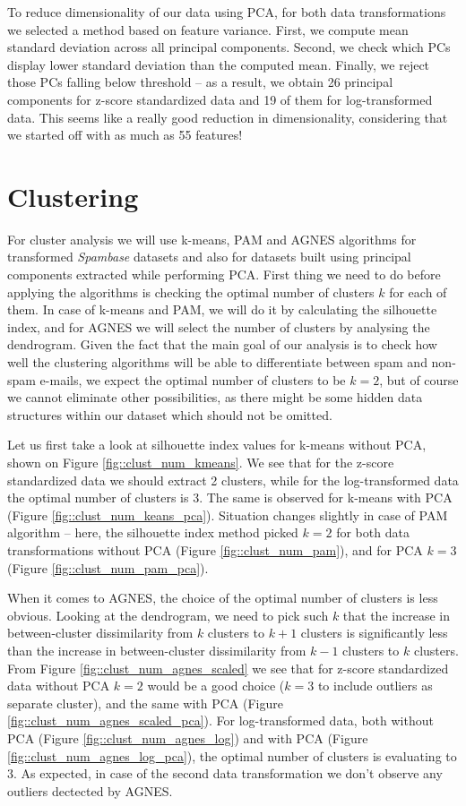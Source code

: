 \documentclass{article}
\begin{document}
	To reduce dimensionality of our data using PCA, for both data transformations we selected a method based on feature variance. First, we compute
	mean standard deviation across all principal components. Second, we check which PCs display lower standard deviation than the computed mean. Finally,
	we reject those PCs falling below threshold -- as a result, we obtain 26 principal components for z-score standardized data and 19 of them for log-transformed data.
	This seems like a really good reduction in dimensionality, considering that we started off with as much as 55 features! 
	
	\section{Clustering}
	For cluster analysis we will use k-means, PAM and AGNES algorithms for transformed \textit{Spambase} datasets and also for datasets built using principal components extracted while performing PCA. 
	First thing we need to do before applying the algorithms is checking the optimal number of clusters $k$ for each of them.
	In case of k-means and PAM, we will do it by calculating the silhouette index, and for AGNES we will select the number of clusters by analysing the dendrogram.
	Given the fact that the main goal of our analysis is to check how well the clustering algorithms will be able to differentiate between spam and non-spam e-mails,
	we expect the optimal number of clusters to be $k=2$, but of course we cannot eliminate other possibilities, as there might be some hidden data structures within our 
	dataset which should not be omitted.
	
	Let us first take a look at silhouette index values for k-means without PCA, shown on Figure \ref{fig::clust_num_kmeans}. We see that for the z-score standardized
	data we should extract 2 clusters, while for the log-transformed data the optimal number of clusters is 3. The same is observed for k-means with PCA (Figure \ref{fig::clust_num_keans_pca}).
	Situation changes slightly in case of PAM algorithm -- here, the silhouette index method picked $k=2$ for both data transformations without PCA (Figure \ref{fig::clust_num_pam}),
	and for PCA $k=3$ (Figure \ref{fig::clust_num_pam_pca}).

	When it comes to AGNES, the choice of the optimal number of clusters is less obvious. Looking at the dendrogram, we need to pick such $k$ that the increase
	in between-cluster dissimilarity from $k$ clusters to $k+1$ clusters is significantly less than the increase in between-cluster dissimilarity from $k-1$ clusters to $k$ clusters.
	From Figure \ref{fig::clust_num_agnes_scaled} we see that for z-score standardized data without PCA $k=2$ would be a good choice ($k=3$ to include outliers as separate cluster),
	and the same with PCA (Figure \ref{fig::clust_num_agnes_scaled_pca}). For log-transformed data, both without PCA (Figure \ref{fig::clust_num_agnes_log}) and with PCA
	(Figure \ref{fig::clust_num_agnes_log_pca}), the optimal number of clusters is evaluating to 3. As expected, in case of the second data transformation we don't observe any outliers dectected by AGNES.
\end{document}
